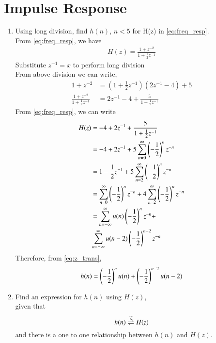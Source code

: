 \documentclass[journal,12pt,twocolumn]{IEEEtran}
\renewcommand\thesection{\arabic{section}}
\begin{document}
\section{Impulse Response}
\begin{enumerate}[label=\thesection.\arabic*]
	\item Using long division, 
find $h(n)$,  $n < 5$ for H(z) in 
		\eqref{eq:freq_resp}.\\
\solution From \eqref{eq:freq_resp}, we have\\
\begin{align}
H(z) = \frac{1 + z^{-2}}{1 + \frac{1}{2}z^{-1}}
\end{align}
Substitute $z^{-1} = x$ to perform long division
\\

From above division we can write,
\begin{align}
1+z^{-2} &= (1+\frac{1}{2}z^{-1})(2z^{-1}-4) + 5\\
\frac{1+z^{-2}}{1+\frac{1}{2}z^{-1}} &= 2z^{-1}-4 + \frac{5}{1+\frac{1}{2}z^{-1}}
\end{align}
From \eqref{eq:freq_resp}, we can write
\begin{align}
H(z) &= -4 + 2z^{-1} + \frac{5}{1 + \frac{1}{2}z^{-1}} \\
&= -4 + 2z^{-1} + 5\sum_{n = 0}^{\infty}\left(-\frac{1}{2}\right)^nz^{-n} \\
&= 1 - \frac{1}{2}z^{-1} + 5\sum_{n = 2}^{\infty}\left(-\frac{1}{2}\right)^nz^{-n} \\
&= \sum_{n = 0}^{\infty}\left(-\frac{1}{2}\right)^nz^{-n} + 4\sum_{n = 2}^{\infty}\left(-\frac{1}{2}\right)^nz^{-n} \\
&= \sum_{n = -\infty}^{\infty}u(n)\left(-\frac{1}{2}\right)^nz^{-n} + \nonumber \\
&\sum_{n = -\infty}^{\infty}u(n - 2)\left(-\frac{1}{2}\right)^{n - 2}z^{-n}
\end{align}
Therefore, from \eqref{eq:z_trans}, 
\begin{align}
	h(n) = \left(-\frac{1}{2}\right)^{n}u(n) + \left(-\frac{1}{2}\right)^{n-2}u(n-2)
\end{align}
\item \label{prob:impulse_resp}
Find an expression for $h(n)$ using $H(z)$,\\ given that 
\begin{equation}
\label{eq:impulse_resp}
h(n) \overset{\mathcal{Z}}{ \rightleftharpoons} H(z)
\end{equation}
and there is a one to one relationship between $h(n)$ and $H(z)$.\\

\end{enumerate}
\end{document}
